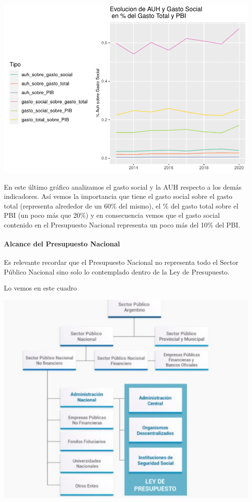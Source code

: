 \documentclass[
  12,
]{article}
\begin{document}
\includegraphics{Grupo4_Final_files/figure-latex/graficos_presu_11-1.pdf}

En este último gráfico analizamos el gasto social y la AUH respecto a
los demás indicadores. Así vemos la importancia que tiene el gasto
social sobre el gasto total (representa alrededor de un 60\% del mismo),
el \% del gasto total sobre el PBI (un poco más que 20\%) y en
consecuencia vemos que el gasto social contenido en el Presupuesto
Nacional representa un poco más del 10\% del PBI.

\hypertarget{alcance-del-presupuesto-nacional}{%
\paragraph{Alcance del Presupuesto
Nacional}\label{alcance-del-presupuesto-nacional}}

Es relevante recordar que el Presupuesto Nacional no representa todo el
Sector Público Nacional sino solo lo contemplado dentro de la Ley de
Presupuesto.

Lo vemos en este cuadro

\includegraphics{Alcance_presupuesto.JPG}
\end{document}
